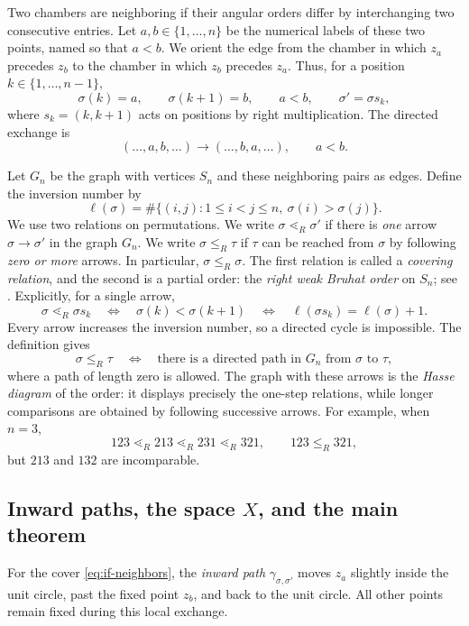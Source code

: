 \documentclass[12pt]{amsart}
\theoremstyle{definition}
\numberwithin{equation}{section}
\theoremstyle{definition}
\let\gm\gamma
\let\si\sigma
\let\le\leqslant
\def\beq{\begin{equation}}
\def\eeq{\end{equation}}
\begin{document}
Two chambers are neighboring if their angular orders differ by
interchanging two consecutive entries. Let $a,b\in\{1,\ldots,n\}$
be the numerical labels of these two points, named so that $a<b$.
We orient the edge from the chamber in which $z_a$ precedes $z_b$
to the chamber in which $z_b$ precedes $z_a$. Thus, for a position
$k\in\{1,\ldots,n-1\}$,
\beq\label{eq:if-neighbors}
 \si(k)=a,\qquad \si(k+1)=b,\qquad a<b,
 \qquad \si'=\si s_k,
\eeq
where $s_k=(k,k+1)$ acts on positions by right multiplication.
The directed exchange is
\[
 (\ldots,a,b,\ldots)\longrightarrow(\ldots,b,a,\ldots),\qquad a<b.
\]

Let $G_n$ be the graph with vertices $S_n$ and these neighboring
pairs as edges. Define the inversion number by
\beq\label{eq:if-inversion-length}
 \ell(\si)=\#\{(i,j):1\le i<j\le n,\ \si(i)>\si(j)\}.
\eeq
We use two relations on permutations. We write
$\si\lessdot_R\si'$ if there is \emph{one} arrow
$\si\longrightarrow\si'$ in the graph $G_n$.
We write $\si\le_R\tau$ if $\tau$ can be reached from $\si$
by following \emph{zero or more} arrows. In particular,
$\si\le_R\si$. The first relation is called a \emph{covering
relation}, and the second is a partial order: the
\emph{right weak Bruhat order} on $S_n$; see
\cite[Section~3.1]{BB05}. Explicitly, for a single arrow,
\beq\label{eq:if-weak-cover}
 \si\lessdot_R\si s_k
 \quad\Longleftrightarrow\quad
 \si(k)<\si(k+1)
 \quad\Longleftrightarrow\quad
 \ell(\si s_k)=\ell(\si)+1.
\eeq
Every arrow increases the inversion number, so a directed
cycle is impossible. The definition gives
\beq\label{eq:if-weak-reachability}
 \si\le_R\tau\quad\Longleftrightarrow\quad
 \text{there is a directed path in $G_n$ from $\si$ to $\tau$},
\eeq
where a path of length zero is allowed. The graph with these
arrows is the \emph{Hasse diagram} of the order: it displays
precisely the one-step relations, while longer comparisons are
obtained by following successive arrows.
For example, when $n=3$,
\[
 123\lessdot_R213\lessdot_R231\lessdot_R321,
 \qquad 123\le_R321,
\]
but $213$ and $132$ are incomparable.

\subsection{Inward paths, the space \texorpdfstring{$X$}{X}, and the main theorem}
\label{subsec:if-space-X}

For the cover \eqref{eq:if-neighbors}, the \emph{inward path}
$\gm_{\si,\si'}$ moves $z_a$ slightly inside the unit circle,
past the fixed point $z_b$, and back to the unit circle. All other
points remain fixed during this local exchange.
\end{document}
